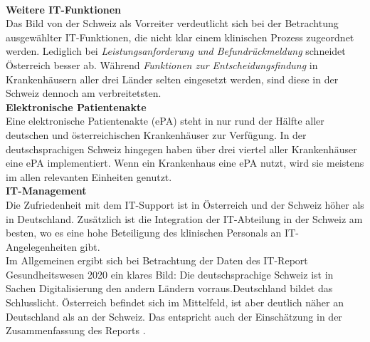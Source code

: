\vspace{\parheadvspace}\\
\textbf{Weitere IT-Funktionen}\\
Das Bild von der Schweiz als Vorreiter verdeutlicht sich bei der Betrachtung ausgewählter IT-Funktionen, die nicht klar einem klinischen Prozess zugeordnet werden. Lediglich bei \textit{Leistungsanforderung und Befundrückmeldung} schneidet Österreich besser ab. Während \textit{Funktionen zur Entscheidungsfindung} in Krankenhäusern aller drei Länder selten eingesetzt werden, sind diese in der Schweiz dennoch am verbreitetsten.
\vspace{\parheadvspace}\\
\textbf{Elektronische Patientenakte}\\
Eine elektronische Patientenakte (ePA) steht in nur rund der Hälfte aller deutschen und österreichischen Krankenhäuser zur Verfügung. In der deutschsprachigen Schweiz hingegen haben über drei viertel aller Krankenhäuser eine ePA implementiert. Wenn ein Krankenhaus eine ePA nutzt, wird sie meistens im allen relevanten Einheiten genutzt.
\vspace{\parheadvspace}\\
\textbf{IT-Management}\\
Die Zufriedenheit mit dem IT-Support ist in Österreich und der Schweiz höher als in Deutschland. Zusätzlich ist die Integration der IT-Abteilung in der Schweiz am besten, wo es eine hohe Beteiligung des klinischen Personals an IT-Angelegenheiten gibt.\\

Im Allgemeinen ergibt sich bei Betrachtung der Daten des IT-Report Gesundheitswesen 2020 ein klares Bild: Die deutschsprachige Schweiz ist in Sachen Digitalisierung den andern Ländern vorraus.Deutschland bildet das Schlusslicht. Österreich befindet sich im Mittelfeld, ist aber deutlich näher an Deutschland als an der Schweiz. Das entspricht auch der Einschätzung in der Zusammenfassung des Reports \parencite[29]{huebner2020}.

